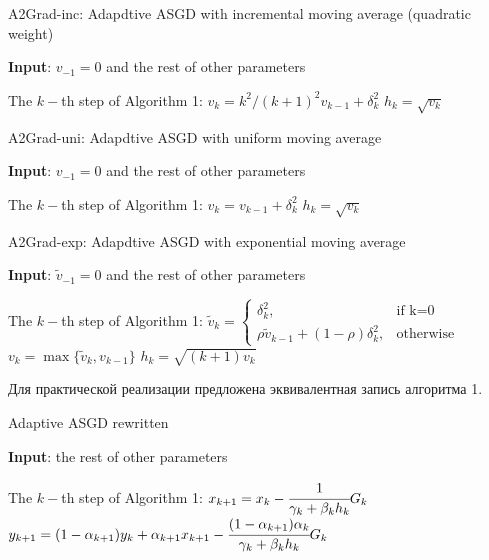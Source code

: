\documentclass[a4paper,12pt]{article}
\theoremstyle{plain} %
\theoremstyle{definition} %
\theoremstyle{remark} %
\theoremstyle{definition}
\theoremstyle{definition}
\begin{document}
	
	
	
	\begin{algorithm}[h!]
		\caption{A2Grad-inc: Adapdtive ASGD with incremental moving average (quadratic weight)}
		\textbf{Input}: $v_{-1}=0$ and the rest of other parameters
		\begin{algorithmic}
			\STATE The $k-$th step of Algorithm 1:
			\STATE $v_{k}=k^{2}/(k+1)^{2}v_{k-1}+\delta_{k}^{2}$
			\STATE $h_{k}=\sqrt{v_{k}}$
		\end{algorithmic}
	\end{algorithm}
	
	
	\begin{algorithm}[h!]
		\caption{A2Grad-uni: Adapdtive ASGD with uniform moving average}
		\textbf{Input}: $v_{-1}=0$ and the rest of other parameters
		\begin{algorithmic}
			\STATE The $k-$th step of Algorithm 1:
			\STATE $v_{k}=v_{k-1}+\delta_{k}^{2}$
			\STATE $h_{k}=\sqrt{v_{k}}$
		\end{algorithmic}
	\end{algorithm}
	
	\begin{algorithm}[h!]
		\caption{A2Grad-exp: Adapdtive ASGD with exponential moving average}
		\textbf{Input}: $\tilde{v}_{-1}=0$ and the rest of other parameters
		\begin{algorithmic}
			\STATE The $k-$th step of Algorithm 1:
			\STATE $\tilde{v}_{k}=
			\begin{cases}
			\delta_{k}^{2}, &\text{if k=0}
			\\
			\rho\tilde{v}_{k-1}+(1-\rho)\delta_{k}^{2}, &\text{otherwise}
			\end{cases}$
			\STATE $v_{k}=\max\{\tilde{v}_{k}, v_{k-1}\}$
			\STATE $h_{k}=\sqrt{(k+1)v_{k}}$
		\end{algorithmic}
	\end{algorithm}
	
	Для практической реализации предложена эквивалентная запись алгоритма 1. 
	
	
	
	
	
	
	
	
	
	
	\begin{algorithm}[h!]
		\caption{Adaptive ASGD rewritten}
		\textbf{Input}: the rest of other parameters
		\begin{algorithmic}
			\STATE The $k-$th step of Algorithm 1:
			\STATE $x_{k+1}=x_{k}-\cfrac{1}{\gamma_{k}+\beta_{k}h_{k}}G_{k}$
			\STATE $y_{k+1}=(1-\alpha_{k+1})y_{k}+\alpha_{k+1}x_{k+1}-\cfrac{(1-\alpha_{k+1})\alpha_{k}}{\gamma_{k}+\beta_{k}h_{k}}G_{k}$
		\end{algorithmic}
	\end{algorithm}
	
\end{document}
